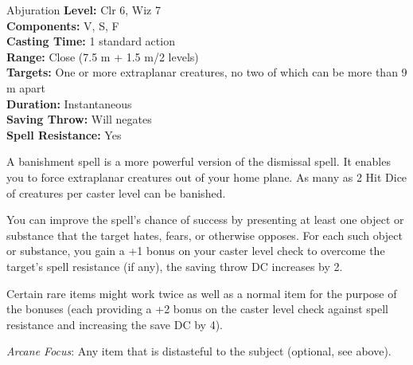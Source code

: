 {Abjuration}
{
	\textbf{Level:}
	Clr 6, Wiz 7\\
	\textbf{Components:}
	V, S, F\\
	\textbf{Casting Time:}
	1 standard action\\
	\textbf{Range:}
	Close (7.5 m + 1.5 m/2 levels)\\
	\textbf{Targets:}
	One or more extraplanar creatures, no two of which can be more than 9 m apart\\
	\textbf{Duration:}
	Instantaneous\\
	\textbf{Saving Throw:}
	Will negates\\
	\textbf{Spell Resistance:}
	Yes\\
}
{
	A banishment spell is a more powerful version of the dismissal spell. It enables you to force extraplanar creatures out of your home plane. As many as 2 Hit Dice of creatures per caster level can be banished.

	You can improve the spell's chance of success by presenting at least one object or substance that the target hates, fears, or otherwise opposes. For each such object or substance, you gain a +1 bonus on your caster level check to overcome the target's spell resistance (if any), the saving throw DC increases by 2.

	Certain rare items might work twice as well as a normal item for the purpose of the bonuses (each providing a +2 bonus on the caster level check against spell resistance and increasing the save DC by 4).

	\textit{Arcane Focus}:
	Any item that is distasteful to the subject (optional, see above).

}
